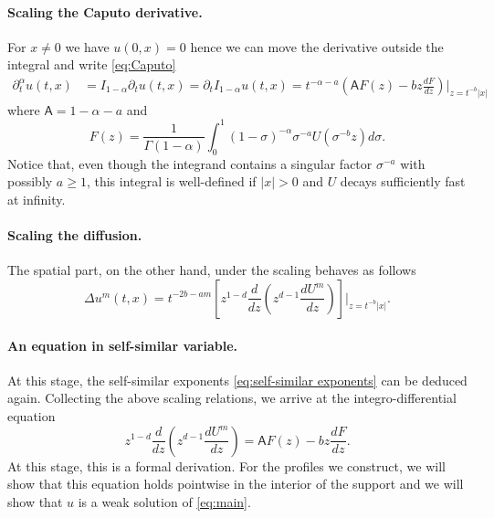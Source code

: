 \documentclass[a4paper]{article}
\theoremstyle{definition}
\begin{document}
\paragraph{Scaling the Caputo derivative.} 
For $x \ne 0$ we have $u(0,x) = 0$ hence we can move the derivative outside the integral and write \eqref{eq:Caputo}
\begin{align*}
  \partial_t^\alpha u(t,x)
  & = I_{1-\alpha} \partial_t u (t,x)                                                                                                           = \partial_t I_{1-\alpha} u (t,x) %
  = t^{-\alpha-a} \left( \mathsf A F(z) - b z \frac{dF}{dz}  \right)\Bigg|_{z = t^{-b}|x|}
\end{align*}
where $\mathsf A = 1-\alpha-a$ and
\[
  F(z) = \frac 1  {\Gamma(1-\alpha)}\int_0^1 (1-\sigma)^{-\alpha} \sigma^{-a} U(\sigma^{-b} z) d\sigma.
\]
Notice that, even though the integrand contains a singular factor $\sigma^{-a}$ with possibly $a \ge 1$,  this integral is well-defined if $|x| > 0$ and $U$ decays sufficiently fast at infinity.

\paragraph{Scaling the diffusion.} The spatial part, on the other hand, under the scaling behaves as follows
\[
  \Delta u^{m} (t,x) = t^{-2b-am} \left[ z^{1-d} \frac{d}{dz}\left(z^{d-1} \frac{dU^{m}}{dz}\right) \right] \Bigg|_{z=t^{-b} |x|}.
\]

\paragraph{An equation in self-similar variable.}
At this stage, the self-similar exponents \eqref{eq:self-similar exponents} can be deduced again.
Collecting the above scaling relations, we arrive at the integro-differential equation
\begin{equation}
  \label{eq:profile equation second order}
  z^{1-d} \frac{d}{dz} \left(z^{d-1} \frac{dU^{m}}{dz} \right) = \mathsf A F(z) - b z \frac{dF}{dz}.
\end{equation}
At this stage, this is a formal derivation. For the profiles we construct, we will show that this equation holds pointwise in the interior of the support and we will show that $u$ is a weak solution of \eqref{eq:main}.

\end{document}
